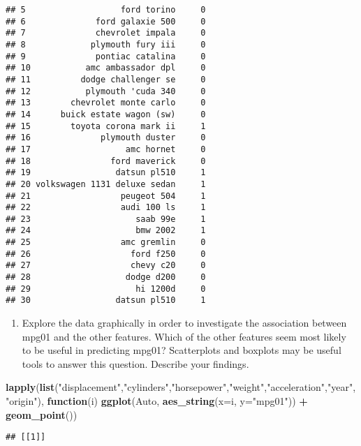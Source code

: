 \documentclass[]{article}
\newenvironment{Shaded}{\begin{snugshade}}{\end{snugshade}}
\newcommand{\KeywordTok}[1]{\textcolor[rgb]{0.13,0.29,0.53}{\textbf{#1}}}
\newcommand{\DataTypeTok}[1]{\textcolor[rgb]{0.13,0.29,0.53}{#1}}
\newcommand{\StringTok}[1]{\textcolor[rgb]{0.31,0.60,0.02}{#1}}
\newcommand{\ControlFlowTok}[1]{\textcolor[rgb]{0.13,0.29,0.53}{\textbf{#1}}}
\newcommand{\OperatorTok}[1]{\textcolor[rgb]{0.81,0.36,0.00}{\textbf{#1}}}
\newcommand{\NormalTok}[1]{#1}
\providecommand{\tightlist}{%
  \setlength{\itemsep}{0pt}\setlength{\parskip}{0pt}}
\begin{document}
\begin{verbatim}
## 5                   ford torino     0
## 6              ford galaxie 500     0
## 7              chevrolet impala     0
## 8             plymouth fury iii     0
## 9              pontiac catalina     0
## 10           amc ambassador dpl     0
## 11          dodge challenger se     0
## 12           plymouth 'cuda 340     0
## 13        chevrolet monte carlo     0
## 14      buick estate wagon (sw)     0
## 15        toyota corona mark ii     1
## 16              plymouth duster     0
## 17                   amc hornet     0
## 18                ford maverick     0
## 19                 datsun pl510     1
## 20 volkswagen 1131 deluxe sedan     1
## 21                  peugeot 504     1
## 22                  audi 100 ls     1
## 23                     saab 99e     1
## 24                     bmw 2002     1
## 25                  amc gremlin     0
## 26                    ford f250     0
## 27                    chevy c20     0
## 28                   dodge d200     0
## 29                     hi 1200d     0
## 30                 datsun pl510     1
\end{verbatim}

\begin{enumerate}
\def\labelenumi{(\alph{enumi})}
\setcounter{enumi}{1}
\tightlist
\item
  Explore the data graphically in order to investigate the association
  between mpg01 and the other features. Which of the other features seem
  most likely to be useful in predicting mpg01? Scatterplots and
  boxplots may be useful tools to answer this question. Describe your
  findings.
\end{enumerate}

\begin{Shaded}
\begin{Highlighting}[]
\KeywordTok{lapply}\NormalTok{(}\KeywordTok{list}\NormalTok{(}\StringTok{"displacement"}\NormalTok{,}\StringTok{"cylinders"}\NormalTok{,}\StringTok{"horsepower"}\NormalTok{,}\StringTok{"weight"}\NormalTok{,}\StringTok{"acceleration"}\NormalTok{,}\StringTok{"year"}\NormalTok{,}\StringTok{"origin"}\NormalTok{), }
       \ControlFlowTok{function}\NormalTok{(i) }\KeywordTok{ggplot}\NormalTok{(Auto, }\KeywordTok{aes_string}\NormalTok{(}\DataTypeTok{x=}\NormalTok{i, }\DataTypeTok{y=}\StringTok{"mpg01"}\NormalTok{)) }\OperatorTok{+}\StringTok{ }\KeywordTok{geom_point}\NormalTok{())}
\end{Highlighting}
\end{Shaded}

\begin{verbatim}
## [[1]]
\end{verbatim}
\end{document}
